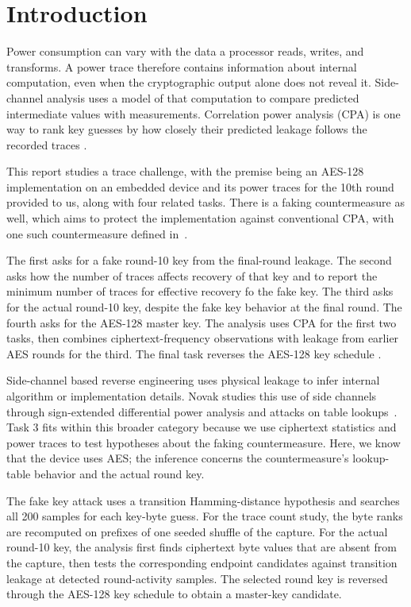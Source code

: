 \documentclass[conference,10pt,letterpaper]{IEEEtran}
\begin{document}
\section{Introduction}
Power consumption can vary with the data a processor reads, writes, and transforms. A power trace therefore contains information about internal computation, even when the cryptographic output alone does not reveal it. Side-channel analysis uses a model of that computation to compare predicted intermediate values with measurements. Correlation power analysis (CPA) is one way to rank key guesses by how closely their predicted leakage follows the recorded traces \cite{kocher,brier}.

This report studies a trace challenge, with the premise being an AES-128 implementation on an embedded device and its power traces for the 10th round provided to us, along with four related tasks. There is a faking countermeasure as well, which aims to protect the implementation against conventional CPA, with one such countermeasure defined in~\cite{faking}.

The first asks for a fake round-10 key from the final-round leakage. The second asks how the number of traces affects recovery of that key and to report the minimum number of traces for effective recovery fo the fake key. The third asks for the actual round-10 key, despite the fake key behavior at the final round. The fourth asks for the AES-128 master key. The analysis uses CPA for the first two tasks, then combines ciphertext-frequency observations with leakage from earlier AES rounds for the third. The final task reverses the AES-128 key schedule \cite{fips197}.

Side-channel based reverse engineering uses physical leakage to infer internal algorithm or implementation details. Novak studies this use of side channels through sign-extended differential power analysis and attacks on table lookups~\cite{novak-reverse}. Task 3 fits within this broader category because we use ciphertext statistics and power traces to test hypotheses about the faking countermeasure. Here, we know that the device uses AES; the inference concerns the countermeasure's lookup-table behavior and the actual round key.

The fake key attack uses a transition Hamming-distance hypothesis and searches all 200 samples for each key-byte guess. For the trace count study, the byte ranks are recomputed on prefixes of one seeded shuffle of the capture. For the actual round-10 key, the analysis first finds ciphertext byte values that are absent from the capture, then tests the corresponding endpoint candidates against transition leakage at detected round-activity samples. The selected round key is reversed through the AES-128 key schedule to obtain a master-key candidate.
\end{document}
